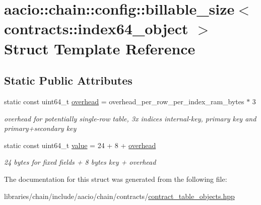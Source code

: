 \hypertarget{structaacio_1_1chain_1_1config_1_1billable__size_3_01contracts_1_1index64__object_01_4}{}\section{aacio\+:\+:chain\+:\+:config\+:\+:billable\+\_\+size$<$ contracts\+:\+:index64\+\_\+object $>$ Struct Template Reference}
\label{structaacio_1_1chain_1_1config_1_1billable__size_3_01contracts_1_1index64__object_01_4}
\subsection*{Static Public Attributes}
\begin{DoxyCompactItemize}
\item 
\mbox{\label{structaacio_1_1chain_1_1config_1_1billable__size_3_01contracts_1_1index64__object_01_4_aab0750bc101463950c9e79147f6e6da8}} 
static const uint64\+\_\+t \mbox{\hyperlink{structaacio_1_1chain_1_1config_1_1billable__size_3_01contracts_1_1index64__object_01_4_aab0750bc101463950c9e79147f6e6da8}{overhead}} = overhead\+\_\+per\+\_\+row\+\_\+per\+\_\+index\+\_\+ram\+\_\+bytes $\ast$ 3
\begin{DoxyCompactList}\small\item\em overhead for potentially single-\/row table, 3x indices internal-\/key, primary key and primary+secondary key \end{DoxyCompactList}\item 
\mbox{\label{structaacio_1_1chain_1_1config_1_1billable__size_3_01contracts_1_1index64__object_01_4_a7c9aa9a8f7928092318d8581db0a78db}} 
static const uint64\+\_\+t \mbox{\hyperlink{structaacio_1_1chain_1_1config_1_1billable__size_3_01contracts_1_1index64__object_01_4_a7c9aa9a8f7928092318d8581db0a78db}{value}} = 24 + 8 + \mbox{\hyperlink{structaacio_1_1chain_1_1config_1_1billable__size_3_01contracts_1_1index64__object_01_4_aab0750bc101463950c9e79147f6e6da8}{overhead}}
\begin{DoxyCompactList}\small\item\em 24 bytes for fixed fields + 8 bytes key + overhead \end{DoxyCompactList}\end{DoxyCompactItemize}


The documentation for this struct was generated from the following file\+:\begin{DoxyCompactItemize}
\item 
libraries/chain/include/aacio/chain/contracts/\mbox{\hyperlink{contract__table__objects_8hpp}{contract\+\_\+table\+\_\+objects.\+hpp}}\end{DoxyCompactItemize}
